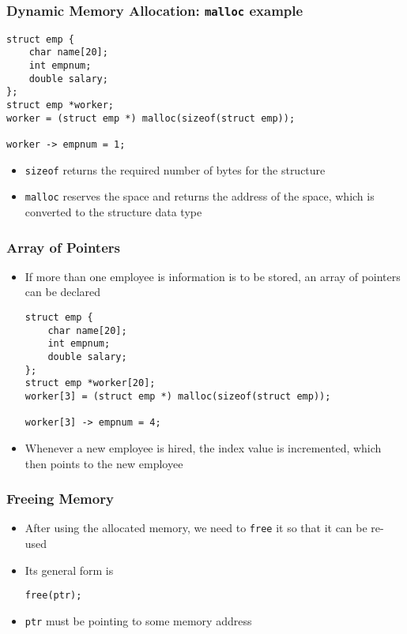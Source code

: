 \documentclass[11pt]{beamer}
\begin{document}
\begin{frame}[fragile]\frametitle{Dynamic Memory Allocation: \verb~malloc~ example}
\label{sec-1-13}


\begin{verbatim}
struct emp {
    char name[20];
    int empnum;
    double salary;
};
struct emp *worker;
worker = (struct emp *) malloc(sizeof(struct emp));

worker -> empnum = 1;
\end{verbatim}
\begin{itemize}
\item \verb~sizeof~ returns the required number of bytes for the structure
\item \verb~malloc~ reserves the space and returns the address of the space, which is converted to the structure data type
\end{itemize}
\end{frame}
\begin{frame}[fragile]\frametitle{Array of Pointers}
\label{sec-1-14}

\begin{itemize}
\item If more than one employee is information is to be stored, an array of pointers can be declared

\begin{verbatim}
struct emp {
    char name[20];
    int empnum;
    double salary;
};
struct emp *worker[20];
worker[3] = (struct emp *) malloc(sizeof(struct emp));

worker[3] -> empnum = 4;
\end{verbatim}
\item Whenever a new employee is hired, the index value is incremented, which then points to the new employee
\end{itemize}
\end{frame}
\begin{frame}[fragile]\frametitle{Freeing Memory}
\label{sec-1-15}

\begin{itemize}
\item After using the allocated memory, we need to \verb~free~ it so that it can be re-used
\item Its general form is 

\begin{verbatim}
free(ptr);
\end{verbatim}
\item \verb~ptr~ must be pointing to some memory address
\end{itemize}
\end{frame}
\end{document}
